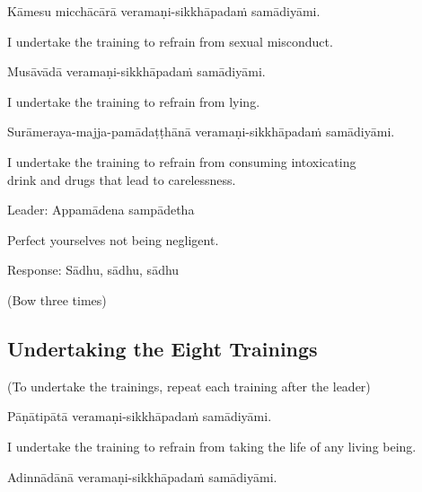 Kāmesu micchācārā veramaṇi-sikkhāpadaṁ samādiyāmi.

\begin{english}
  I undertake the training to refrain from sexual misconduct.
\end{english}

Musāvādā veramaṇi-sikkhāpadaṁ samādiyāmi.

\begin{english}
  I undertake the training to refrain from lying.
\end{english}

\begin{pali-hang}
Surāmeraya-majja-pamādaṭṭhānā veramaṇi-sikkhāpadaṁ samādiyāmi.
\end{pali-hang}

\begin{english-hang}
  I undertake the training to refrain from consuming intoxicating\\
  drink and drugs that lead to carelessness.\hyperlink{endnote137-appendix}{\hypertarget{endnote137-body}{}}
\end{english-hang}

Leader: Appamādena sampādetha

\begin{english}
  Perfect yourselves not being negligent.
\end{english}

Response: Sādhu, sādhu, sādhu

\begin{center}
  (Bow three times)
\end{center}

\subsection{Undertaking the Eight Trainings}

\begin{center}
  (To undertake the trainings, repeat each training after the leader)
\end{center}

Pāṇātipātā veramaṇi-sikkhāpadaṁ samādiyāmi.

\begin{english-hang}
  I undertake the training to refrain from taking the life of any living being.
\end{english-hang}

Adinnādānā veramaṇi-sikkhāpadaṁ samādiyāmi.

